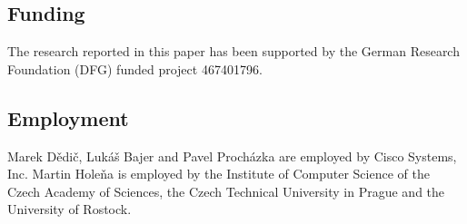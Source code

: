 \subsection*{Funding}

The research reported in this paper has been supported by the German Research Foundation (DFG) funded project 467401796.

\subsection*{Employment}

Marek Dědič, Lukáš Bajer and Pavel Procházka are employed by Cisco Systems, Inc. Martin Holeňa is employed by the Institute of Computer Science of the Czech Academy of Sciences, the Czech Technical University in Prague and the University of Rostock.



